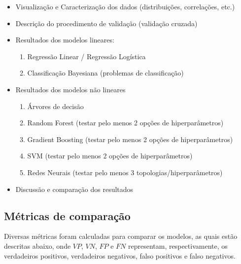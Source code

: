 \documentclass{homework}
\begin{document}
\begin{itemize}
    \color{red}
        \item Visualização e Caracterização dos dados (distribuições, correlações, etc.)
        \item Descrição do procedimento de validação (validação cruzada)
        \item Resultados dos modelos lineares:
            \begin{enumerate}
                \item Regressão Linear / Regressão Logística
                \item Classificação Bayesiana (problemas de classificação)
            \end{enumerate}
        \item Resultados dos modelos não lineares
            \begin{enumerate}
                \item Árvores de decisão
                \item Random Forest (testar pelo menos 2 opções de hiperparâmetros)
                \item Gradient Boosting (testar pelo menos 2 opções de hiperparâmetros)
                \item SVM (testar pelo menos 2 opções de hiperparâmetros)
                \item Redes Neurais (testar pelo menos 3 topologias/hiperparâmetros)
            \end{enumerate}
        \item Discussão e comparação dos resultados
\end{itemize}

\subsection{Métricas de comparação}

Diversas métricas foram calculadas para comparar os modelos, as quais estão descritas abaixo, onde  $VP$, $VN$, $FP$ e
$FN$ representam, respectivamente, os verdadeiros positivos, verdadeiros negativos, falso positivos e falso negativos.
\end{document}
